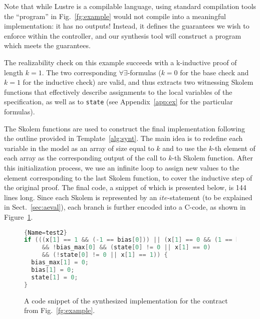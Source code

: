 Note that while Lustre is a compilable language, using standard compilation tools the ``program'' in Fig.~\ref{fg:example} would not compile into a meaningful implementation: it has no outputs!  Instead, it defines the guarantees we wish to enforce within the controller, and our synthesis tool will construct a program which meets the guarantees.

The realizability check on this example succeeds with a k-inductive
proof of length $k = 1$. The two corresponding
$\forall\exists$-formulas ($k=0$ for the base check and $k=1$ for the
inductive check) are valid, and thus \aeval extracts two witnessing
Skolem functions that effectively describe assignments to the local
variables of the specification, as well as to \texttt{state} (see
Appendix~\ref{app:ex} for the particular formulas).

The Skolem functions are used to construct the final implementation
following the outline provided in Template~\ref{alg:synt}.
The main idea is to redefine each variable in the model
as an array of size equal to $k$ and
to use the $k$-th element of each array as the corresponding output of the call
to $k$-th Skolem function. After this initialization process, we use an infinite
loop to assign new values to the element corresponding to the last Skolem
function, to cover the inductive step of the original proof. The final code, a
snippet of which is presented below, is 144 lines long.
Since each Skolem is represented by an $\mathit{ite}$-statement (to be explained
in Sect.~\ref{sec:aeval}), each branch is further encoded into a C-code, as
shown in Figure~\ref{fg:snippet}.

\begin{figure}[t!]
\vspace{-2em}
\begin{minipage}{2.0\textwidth}
\begin{lstlisting}[basicstyle=\scriptsize,language=C]{Name=test2}
if (((x[1] == 1 && (-1 == bias[0])) || (x[1] == 0 && (1 == bias[0])))
     && !bias_max[0] && (state[0] != 0 || x[1] == 0)
     && (!state[0] != 0 || x[1] == 1)) {
  bias_max[1] = 0;
  bias[1] = 0;
  state[1] = 0;
}
\end{lstlisting}%
\end{minipage}
\vspace{-1em}
\caption{A code snippet of the synthesized implementation for the contract from Fig.~\ref{fg:example}.}
\vspace{-.5em}
\label{fg:snippet}
\end{figure}%

